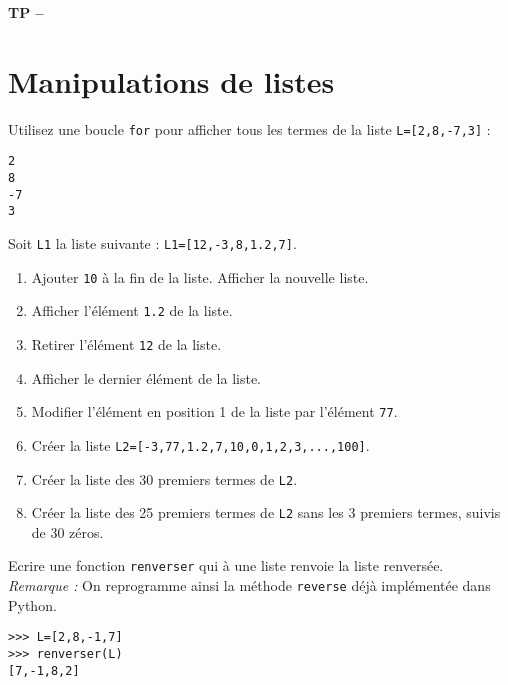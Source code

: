 






\begin{center}
{\Large\bf TP \no {\numero} -- \descrip}
\end{center}




\section{Manipulations de listes}


\begin{exercice}
Utilisez une boucle \verb?for? pour afficher tous les termes de la liste \verb?L=[2,8,-7,3]? :
\begin{verbatim}
2
8
-7
3
\end{verbatim}
\end{exercice}


\begin{exercice}
Soit \verb?L1? la liste suivante : \verb?L1=[12,-3,8,1.2,7]?.
\begin{enumerate}
\item Ajouter \verb?10? \` a la fin de la liste. Afficher la nouvelle liste.
\item Afficher l'\' el\' ement \verb?1.2? de la liste.
\item Retirer l'\' el\' ement \verb?12? de la liste. 
\item Afficher le dernier \' el\' ement de la liste.
\item Modifier l'\' el\' ement en position 1 de la liste par l'\' el\' ement \verb?77?.
\item Cr\' eer la liste \verb?L2=[-3,77,1.2,7,10,0,1,2,3,...,100]?.
\item Cr\' eer la liste des 30 premiers termes de \verb?L2?.
\item Cr\' eer la liste des 25 premiers termes de \verb?L2? sans les 3 premiers termes, suivis de 30 z\' eros.
\end{enumerate}
\end{exercice}

\begin{exercice}
Ecrire une fonction \verb?renverser? qui \` a une liste renvoie la liste renvers\' ee.\\
\textit{Remarque : }On reprogramme ainsi la m\' ethode \verb?reverse? d\' ej\` a impl\' ement\' ee dans Python.
\begin{verbatim}
>>> L=[2,8,-1,7]
>>> renverser(L)
[7,-1,8,2]
\end{verbatim}
\end{exercice}



